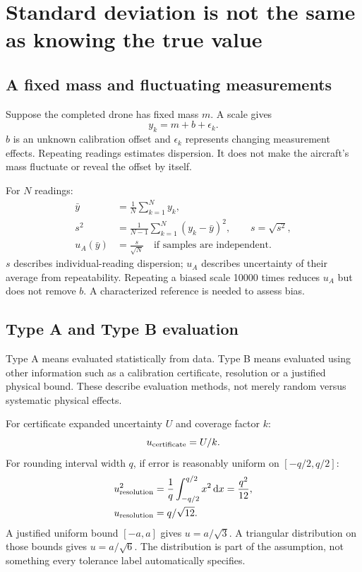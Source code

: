 \chapter{Standard deviation is not the same as knowing the true value}
\section{A fixed mass and fluctuating measurements}
Suppose the completed drone has fixed mass $m$. A scale gives
\begin{equation}
y_k=m+b+\epsilon_k.
\end{equation}
$b$ is an unknown calibration offset and $\epsilon_k$ represents changing
measurement effects. Repeating readings estimates dispersion. It does not make
the aircraft's mass fluctuate or reveal the offset by itself.

For $N$ readings:
\begin{align}
\bar y&=\frac1N\sum_{k=1}^Ny_k,\\
s^2&=\frac1{N-1}\sum_{k=1}^N(y_k-\bar y)^2,\qquad s=\sqrt{s^2},\\
u_A(\bar y)&=\frac{s}{\sqrt N}\quad\text{if samples are independent}.
\end{align}
$s$ describes individual-reading dispersion; $u_A$ describes uncertainty of
their average from repeatability. Repeating a biased scale 10000 times reduces
$u_A$ but does not remove $b$. A characterized reference is needed to assess bias.

\section{Type A and Type B evaluation}
Type A means evaluated statistically from data. Type B means evaluated using
other information such as a calibration certificate, resolution or a justified
physical bound. These describe evaluation methods, not merely random versus
systematic physical effects.

For certificate expanded uncertainty $U$ and coverage factor $k$:
\begin{equation}
u_{\rm certificate}=U/k.
\end{equation}
For rounding interval width $q$, if error is reasonably uniform on $[-q/2,q/2]$:
\begin{align}
u_{\rm resolution}^2
&=\frac1q\int_{-q/2}^{q/2}x^2\,\mathrm d x=\frac{q^2}{12},\\
u_{\rm resolution}&=q/\sqrt{12}.
\end{align}
A justified uniform bound $[-a,a]$ gives $u=a/\sqrt3$.
A triangular distribution on those bounds gives $u=a/\sqrt6$.
The distribution is part of the assumption, not something every tolerance label
automatically specifies.

